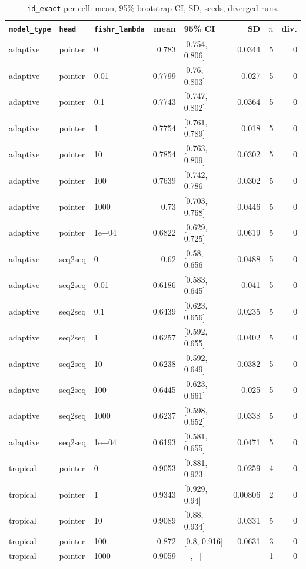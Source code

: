 \documentclass[10pt]{article}
\begin{document}
{\small
\begin{longtable}{lllrlrrr}
\caption{\texttt{id\_exact} per cell: mean, 95\% bootstrap CI, SD, seeds, diverged runs.}\label{tab:summary-id_exact}\\
\toprule
\texttt{model\_type} & \texttt{head} & \texttt{fishr\_lambda} & mean & 95\% CI & SD & $n$ & div.\\
\midrule
\endhead
adaptive & pointer & 0 & 0.783 & [0.754, 0.806] & 0.0344 & 5 & 0\\
adaptive & pointer & 0.01 & 0.7799 & [0.76, 0.803] & 0.027 & 5 & 0\\
adaptive & pointer & 0.1 & 0.7743 & [0.747, 0.802] & 0.0364 & 5 & 0\\
adaptive & pointer & 1 & 0.7754 & [0.761, 0.789] & 0.018 & 5 & 0\\
adaptive & pointer & 10 & 0.7854 & [0.763, 0.809] & 0.0302 & 5 & 0\\
adaptive & pointer & 100 & 0.7639 & [0.742, 0.786] & 0.0302 & 5 & 0\\
adaptive & pointer & 1000 & 0.73 & [0.703, 0.768] & 0.0446 & 5 & 0\\
adaptive & pointer & 1e+04 & 0.6822 & [0.629, 0.725] & 0.0619 & 5 & 0\\
adaptive & seq2seq & 0 & 0.62 & [0.58, 0.656] & 0.0488 & 5 & 0\\
adaptive & seq2seq & 0.01 & 0.6186 & [0.583, 0.645] & 0.041 & 5 & 0\\
adaptive & seq2seq & 0.1 & 0.6439 & [0.623, 0.656] & 0.0235 & 5 & 0\\
adaptive & seq2seq & 1 & 0.6257 & [0.592, 0.655] & 0.0402 & 5 & 0\\
adaptive & seq2seq & 10 & 0.6238 & [0.592, 0.649] & 0.0382 & 5 & 0\\
adaptive & seq2seq & 100 & 0.6445 & [0.623, 0.661] & 0.025 & 5 & 0\\
adaptive & seq2seq & 1000 & 0.6237 & [0.598, 0.652] & 0.0338 & 5 & 0\\
adaptive & seq2seq & 1e+04 & 0.6193 & [0.581, 0.655] & 0.0471 & 5 & 0\\
tropical & pointer & 0 & 0.9053 & [0.881, 0.923] & 0.0259 & 4 & 0\\
tropical & pointer & 1 & 0.9343 & [0.929, 0.94] & 0.00806 & 2 & 0\\
tropical & pointer & 10 & 0.9089 & [0.88, 0.934] & 0.0331 & 5 & 0\\
tropical & pointer & 100 & 0.872 & [0.8, 0.916] & 0.0631 & 3 & 0\\
tropical & pointer & 1000 & 0.9059 & [--, --] & -- & 1 & 0\\

\end{longtable}}
\end{document}
